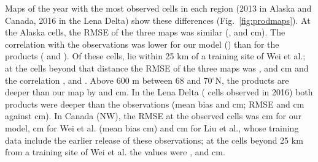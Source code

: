 
Maps of the year with the most observed cells in each region (2013 in Alaska and Canada, 2016 in the Lena Delta) show these differences (Fig.~\ref{fig:prodmaps}). At the \nfeAkN{} Alaska cells, the RMSE of the three maps was similar (\nfeAkOof{}, \nfeAkWei{} and \nfeAkLiu{} cm). The correlation with the observations was lower for our model (\nfeAkROof) than for the products (\nfeAkRWei{} and \nfeAkRLiu). Of these cells, \nfeAkNNear{} lie within 25 km of a training site of Wei et al.; at the \nfeAkNFar{} cells beyond that distance the RMSE of the three maps was \nfeAkFarOof{}, \nfeAkFarWei{} and \nfeAkFarLiu{} cm and the correlation \nfeAkFarROof{}, \nfeAkFarRWei{} and \nfeAkFarRLiu. Above 600 m between 68 and 70$^\circ$N, the products are deeper than our map by \nmapAkFootMtnWei{} and \nmapAkFootMtnLiu{} cm. In the Lena Delta (\nfeLeN{} cells observed in 2016) both products were deeper than the observations (mean bias \nfeLeBiasWei{} and \nfeLeBiasLiu{} cm; RMSE \nfeLeWei{} and \nfeLeLiu{} cm against \nfeLeOof{} cm). In Canada (NW), the RMSE at the \nfeCaN{} observed cells was \nfeCaOof{} cm for our model, \nfeCaWei{} cm for Wei et al. (mean bias \nfeCaBiasWei{} cm) and \nfeCaLiu{} cm for Liu et al., whose training data include the earlier release of these observations; at the \nfeCaNFar{} cells beyond 25 km from a training site of Wei et al. the values were \nfeCaFarOof{}, \nfeCaFarWei{} and \nfeCaFarLiu{} cm.

